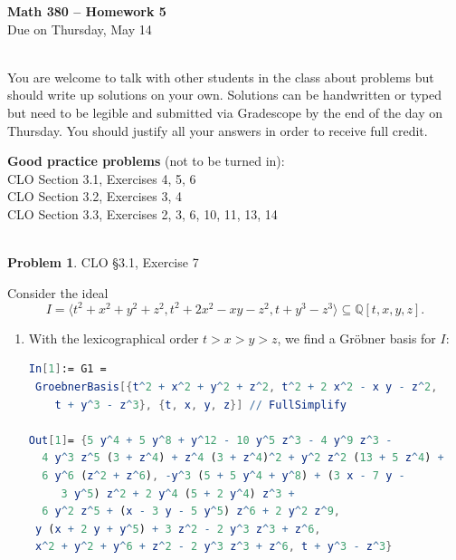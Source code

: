 \documentclass[12pt]{amsart}
\theoremstyle{definition}
\newtheorem{prob}{Problem}
\begin{document}
 \thispagestyle{empty}
\begin{center} {\large \textbf{Math 380 -- Homework  5}} \smallskip \\ 
Due on Thursday, May 14\ \\ \ \\
 \end{center}

You are welcome to talk with other students in the class about problems but should write up solutions on your own. 
Solutions can be handwritten or typed but need to be legible and submitted via Gradescope by the end of the day 
on Thursday. You should justify all your answers in order to receive full credit.  
\bigskip 

\begin{flushleft}

{\bf Good practice problems} (not to be turned in): \\

CLO Section 3.1, Exercises 4, 5, 6 \\
CLO Section 3.2, Exercises 3, 4 \\
CLO Section 3.3, Exercises 2, 3, 6, 10, 11, 13, 14\\
\ \ \\
\bigskip 




\begin{prob} CLO \S3.1, Exercise 7 \smallskip \\
\end{prob}
\bigskip 

Consider the ideal 
\[ I = \langle t^2 + x^2 + y^2 + z^2 , t^2 + 2x^2 - xy - z^2, t+y^3 - z^3\rangle \subseteq \mathbb Q[t,x,y,z]. \]

\begin{enumerate}
    \item[(a)] With the lexicographical order $t > x > y > z$, we find a Gr\"obner basis for $I$:
    \begin{lstlisting}[language=Mathematica]
In[1]:= G1 = 
 GroebnerBasis[{t^2 + x^2 + y^2 + z^2, t^2 + 2 x^2 - x y - z^2, 
    t + y^3 - z^3}, {t, x, y, z}] // FullSimplify

Out[1]= {5 y^4 + 5 y^8 + y^12 - 10 y^5 z^3 - 4 y^9 z^3 - 
  4 y^3 z^5 (3 + z^4) + z^4 (3 + z^4)^2 + y^2 z^2 (13 + 5 z^4) + 
  6 y^6 (z^2 + z^6), -y^3 (5 + 5 y^4 + y^8) + (3 x - 7 y - 
     3 y^5) z^2 + 2 y^4 (5 + 2 y^4) z^3 + 
  6 y^2 z^5 + (x - 3 y - 5 y^5) z^6 + 2 y^2 z^9, 
 y (x + 2 y + y^5) + 3 z^2 - 2 y^3 z^3 + z^6, 
 x^2 + y^2 + y^6 + z^2 - 2 y^3 z^3 + z^6, t + y^3 - z^3}


\end{lstlisting}
\end{enumerate}
\end{flushleft}
\end{document}
